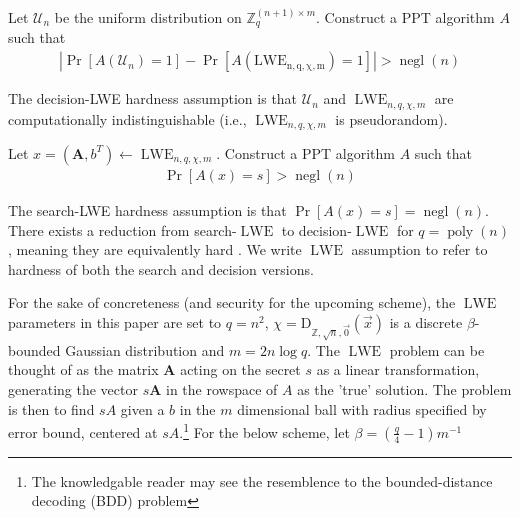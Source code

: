 \begin{definition}
    Let $\mathcal{U}_n$ be the uniform distribution on $\mathbb{Z}_q^{(n+1) \times m}$. Construct a PPT algorithm $A$ such that 
    \begin{equation*}
        \begin{aligned}
        |\operatorname{Pr}[A(\mathcal{U}_n) = 1] - \operatorname{Pr}[A(\operatorname{LWE_{n,q,\chi,m}}) = 1]| > \operatorname{negl}(n)
        \end{aligned}
    \end{equation*}
\end{definition}
The decision-LWE hardness assumption is that $\mathcal{U}_n$ and $\operatorname{LWE}_{n,q,\chi,m}$ are computationally indistinguishable (i.e., $\operatorname{LWE}_{n,q,\chi,m}$ is pseudorandom).
\begin{definition}
    Let $x = (\textbf{A}, b^T) \leftarrow \operatorname{LWE}_{n,q,\chi,m}$. Construct a PPT algorithm $A$ such that 
    \begin{equation*}
        \begin{aligned}
            \operatorname{Pr}[A(x) = s] > \operatorname{negl}(n)
        \end{aligned}
    \end{equation*}
\end{definition}
The search-LWE hardness assumption is that $\operatorname{Pr}[A(x) = s] = \operatorname{negl}(n)$.
There exists a reduction from search-$\operatorname{LWE}$ to decision-$\operatorname{LWE}$ for $q = \operatorname{poly}(n)$, meaning they are equivalently hard \cite{LWE-hardness}. We write $\operatorname{LWE}$ assumption to refer to hardness of both the search and decision versions.

For the sake of concreteness (and security for the upcoming scheme), the $\operatorname{LWE}$ parameters in this paper are set to $q = n^2$, $\chi = \textrm{D}_{\mathbb{Z}, \sqrt{n}, \vec{0}}(\vec{x})$ is a discrete $\beta$-bounded Gaussian distribution and $m = 2n \log q$. The $\operatorname{LWE}$ problem can be thought of as the matrix $\textbf{A}$ acting on the secret $s$ as a linear transformation, generating the vector $s\textbf{A}$ in the rowspace of $A$ as the 'true' solution. The problem is then to find $sA$ given a $b$ in the $m$ dimensional ball with radius specified by error bound, centered at $sA$.\footnote{The knowledgable reader may see the resemblence to the bounded-distance decoding (BDD) problem} For the below scheme, let $\beta = (\frac{q}{4} - 1)m^{-1}$

